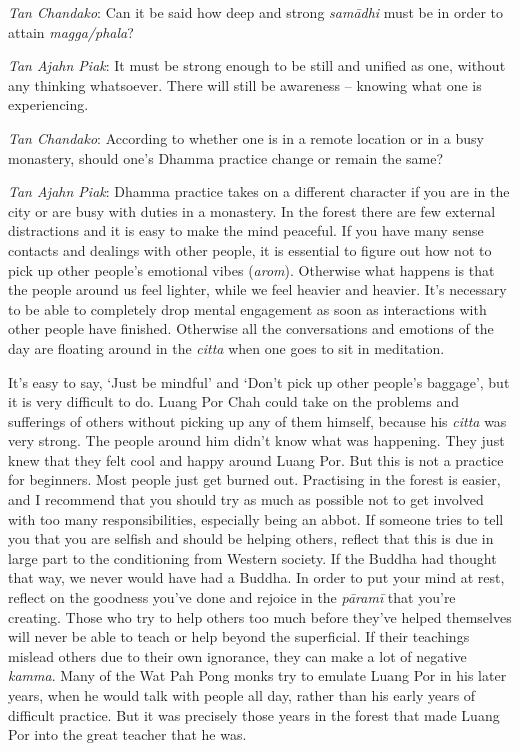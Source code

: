 \emph{Tan Chandako}: Can it be said how deep and strong \emph{samādhi}
must be in order to attain \emph{magga/phala}?

\emph{Tan Ajahn Piak}: It must be strong enough to be still and unified
as one, without any thinking whatsoever. There will still be awareness
-- knowing what one is experiencing.

\emph{Tan Chandako}: According to whether one is in a remote location or
in a busy monastery, should one's Dhamma practice change or remain the
same?

\emph{Tan Ajahn Piak}: Dhamma practice takes on a different character if
you are in the city or are busy with duties in a monastery. In the
forest there are few external distractions and it is easy to make the
mind peaceful. If you have many sense contacts and dealings with other
people, it is essential to figure out how not to pick up other people's
emotional vibes (\emph{arom}). Otherwise what happens is that the people
around us feel lighter, while we feel heavier and heavier. It's
necessary to be able to completely drop mental engagement as soon as
interactions with other people have finished. Otherwise all the
conversations and emotions of the day are floating around in the
\emph{citta} when one goes to sit in meditation.

It's easy to say, `Just be mindful' and `Don't pick up other people's
baggage', but it is very difficult to do. Luang Por Chah could take on
the problems and sufferings of others without picking up any of them
himself, because his \emph{citta} was very strong. The people around him
didn't know what was happening. They just knew that they felt cool and
happy around Luang Por. But this is not a practice for beginners. Most
people just get burned out. Practising in the forest is easier, and I
recommend that you should try as much as possible not to get involved
with too many responsibilities, especially being an abbot. If someone
tries to tell you that you are selfish and should be helping others,
reflect that this is due in large part to the conditioning from Western
society. If the Buddha had thought that way, we never would have had a
Buddha. In order to put your mind at rest, reflect on the goodness
you've done and rejoice in the \emph{pāramī} that you're creating. Those
who try to help others too much before they've helped themselves will
never be able to teach or help beyond the superficial. If their
teachings mislead others due to their own ignorance, they can make a lot
of negative \emph{kamma}. Many of the Wat Pah Pong monks try to emulate
Luang Por in his later years, when he would talk with people all day,
rather than his early years of difficult practice. But it was precisely
those years in the forest that made Luang Por into the great teacher
that he was.

